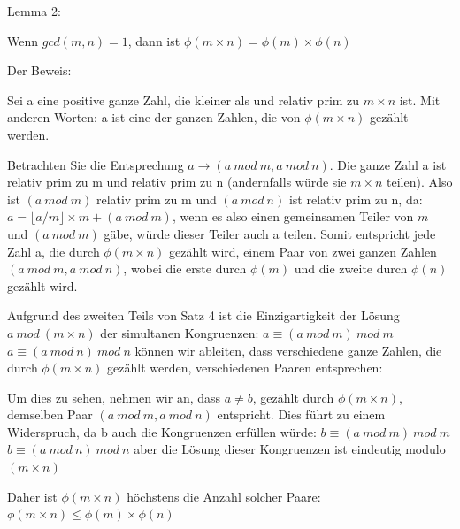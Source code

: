 \documentclass[a4paper]{article}
\begin{document}
\begin{multicols}{3}
\begin{itemize*}
\begin{itemize*}
\begin{itemize*}
                  \end{itemize*}
            \end{itemize*}
            \item Lemma 2:
            \begin{itemize*}
                  \item Wenn $gcd(m,n)=1$, dann ist $\phi(m\times n)=\phi(m)\times \phi(n)$
                  \item Der Beweis:
                  \begin{itemize*}
                        \item Sei a eine positive ganze Zahl, die kleiner als und relativ prim zu $m\times n$ ist. Mit anderen Worten: a ist eine der ganzen Zahlen, die von $\phi(m\times n)$ gezählt werden.
                        \item Betrachten Sie die Entsprechung $a\rightarrow(a\ mod\ m, a\ mod\ n)$. Die ganze Zahl a ist relativ prim zu m und relativ prim zu n (andernfalls würde sie $m \times n$ teilen). Also ist $(a\ mod\ m)$ relativ prim zu m und $(a\ mod\ n)$ ist relativ prim zu n, da: $a=\lfloor a/m\rfloor\times m + (a\ mod\ m)$, wenn es also einen gemeinsamen Teiler von $m$ und $(a\ mod\ m)$ gäbe, würde dieser Teiler auch a teilen. Somit entspricht jede Zahl a, die durch $\phi(m\times n )$ gezählt wird, einem Paar von zwei ganzen Zahlen $(a\ mod\ m,a\ mod\ n)$, wobei die erste durch $\phi(m)$ und die zweite durch $\phi(n)$ gezählt wird.
                        \item Aufgrund des zweiten Teils von Satz 4 ist die Einzigartigkeit der Lösung $a\ mod\ (m\times n)$ der simultanen Kongruenzen: $a \equiv(a\ mod\ m)\ mod\ m$ $a \equiv(a\ mod\ n)\ mod\ n$ können wir ableiten, dass verschiedene ganze Zahlen, die durch $\phi(m\times n)$ gezählt werden, verschiedenen Paaren entsprechen:
                        \begin{itemize*}
                              \item Um dies zu sehen, nehmen wir an, dass $a\not=b$, gezählt durch $\phi(m\times n)$, demselben Paar $(a\ mod\ m, a\ mod\ n)$ entspricht. Dies führt zu einem Widerspruch, da b auch die Kongruenzen erfüllen würde: $b\equiv (a\ mod\ m)\ mod\ m$ $b\equiv (a\ mod\ n)\ mod\ n$ aber die Lösung dieser Kongruenzen ist eindeutig modulo $(m \times n)$
                              \item Daher ist $\phi(m \times n)$ höchstens die Anzahl solcher Paare: $\phi(m \times n)\leq \phi(m)\times \phi(n)$
                        \end{itemize*}

\end{itemize*}
\end{itemize*}
\end{itemize*}
\end{multicols}
\end{document}
